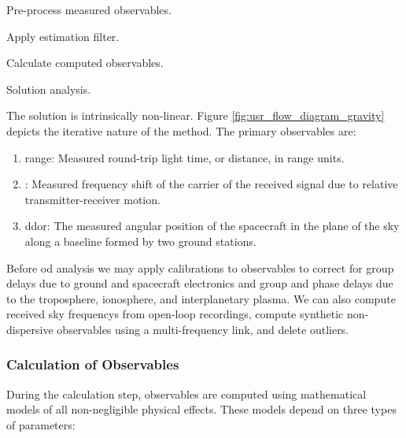 \documentclass[oneside]{book}
\theoremstyle{mystyle}
\begin{document}
\begin{enumerate}[itemsep=0pt]
\begin{multicols}{2}
\item[1.] Pre-process measured observables.
\item[3.] Apply estimation filter.
\item[2.] Calculate computed observables.
\item[4.] Solution analysis.
\end{multicols}
\end{enumerate}

\noindent The solution is intrinsically non-linear. Figure \ref{fig:usr_flow_diagram_gravity} depicts the iterative nature of the method. The primary observables are:

\begin{enumerate}[itemsep=0pt]
\item \Gls{range}: Measured round-trip light time, or distance, in range units.
\item {}: Measured frequency shift of the carrier of the received signal due to relative transmitter-receiver motion.
\item \gls{ddor}: The measured angular position of the spacecraft in the plane of the sky along a baseline formed by two ground stations.
\end{enumerate}

\noindent Before \gls{od} analysis we may apply calibrations to observables to correct for \glspl{group delay} due to ground and spacecraft electronics and group and \glspl{phase delay} due to the \gls{troposphere}, \gls{ionosphere}, and \gls{interplanetary plasma}. We can also compute received \glspl{sky frequency} from \gls{open-loop} recordings, compute synthetic non-dispersive observables using a multi-frequency link, and delete \glspl{outlier}.

\subsubsection{\footnotesize Calculation of Observables}

During the calculation step, observables are computed using mathematical models of all non-negligible physical effects. These models depend on three types of parameters:
\end{document}
